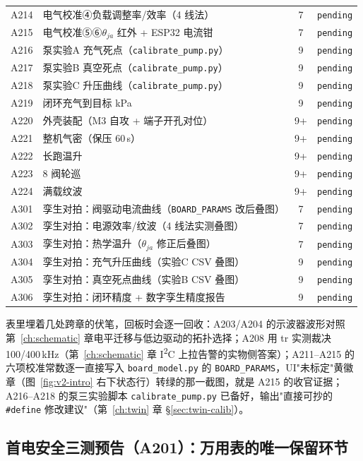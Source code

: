 \begin{longtable}{@{}llc@{}l@{}}
  A214 & 电气校准④负载调整率/效率（4 线法） & 7 & \texttt{pending} \\
  A215 & 电气校准⑤⑥$\theta_{ja}$ 红外 + ESP32 电流钳 & 7 & \texttt{pending} \\
  A216 & 泵实验A 充气死点（\texttt{calibrate\_pump.py}） & 9 & \texttt{pending} \\
  A217 & 泵实验B 真空死点（\texttt{calibrate\_pump.py}） & 9 & \texttt{pending} \\
  A218 & 泵实验C 升压曲线（\texttt{calibrate\_pump.py}） & 9 & \texttt{pending} \\
  A219 & 闭环充气到目标 kPa & 9 & \texttt{pending} \\
  A220 & 外壳装配（M3 自攻 + 端子开孔对位） & 9+ & \texttt{pending} \\
  A221 & 整机气密（保压 60\,s） & 9+ & \texttt{pending} \\
  A222 & 长跑温升 & 9+ & \texttt{pending} \\
  A223 & 8 阀轮巡 & 9+ & \texttt{pending} \\
  A224 & 满载纹波 & 9+ & \texttt{pending} \\
  \midrule
  A301 & 孪生对拍：阀驱动电流曲线（\texttt{BOARD\_PARAMS} 改后叠图） & 7 & \texttt{pending} \\
  A302 & 孪生对拍：电源效率/纹波（4 线法实测叠图） & 7 & \texttt{pending} \\
  A303 & 孪生对拍：热学温升（$\theta_{ja}$ 修正后叠图） & 7 & \texttt{pending} \\
  A304 & 孪生对拍：充气升压曲线（实验C CSV 叠图） & 9 & \texttt{pending} \\
  A305 & 孪生对拍：真空死点曲线（实验B CSV 叠图） & 9 & \texttt{pending} \\
  A306 & 孪生对拍：闭环精度 + 数字孪生精度报告 & 9 & \texttt{pending} \\
\end{longtable}

表里埋着几处跨章的伏笔，回板时会逐一回收：A203/A204 的示波器波形对照第~\ref{ch:schematic} 章电平迁移与低边驱动的拓扑选择；A208 用 tr 实测裁决 100/400\,kHz（第~\ref{ch:schematic} 章 I\textsuperscript{2}C 上拉告警的实物侧答案）；A211--A215 的六项校准常数逐一直接写入 \texttt{board\_model.py} 的 \texttt{BOARD\_PARAMS}，UI"未标定"黄徽章（图~\ref{fig:v2-intro} 右下状态行）转绿的那一截图，就是 A215 的收官证据；A216--A218 的泵三实验脚本 \texttt{calibrate\_pump.py} 已备好，输出"直接可抄的 \texttt{\#define} 修改建议"（第~\ref{ch:twin} 章 \S\ref{sec:twin-calib}）。

\subsection{首电安全三测预告（A201）：万用表的唯一保留环节}
\label{sec:acc-firstpower}

